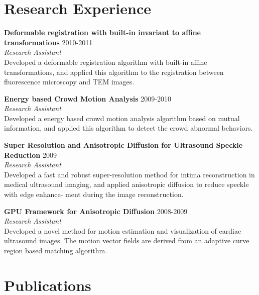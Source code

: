 \documentclass[line,margin]{res}
\begin{document}
\begin{resume}
\section{\sc Research Experience} 
\smallskip

\textbf{Deformable registration with built-in invariant to aﬃne transformations} \hfill      2010-2011 \\
\textit{ Research Assistant}\\
Developed a deformable registration algorithm with built-in aﬃne transformations, and
applied this algorithm to the registration between ﬂuorescence microscopy and TEM images.

\textbf{Energy based Crowd Motion Analysis} \hfill      2009-2010 \\
\textit{Research Assistant}\\
Developed a energy based crowd motion analysis algorithm based on mutual information, and
applied this algorithm to detect the crowd abnormal behaviors.

\textbf{Super Resolution and Anisotropic Diﬀusion for Ultrasound Speckle Reduction} \hfill      2009 \\
\textit{Research Assistant}\\
Developed a fast and robust super-resolution method for intima reconstruction in medical
ultrasound imaging, and applied anisotropic diﬀusion to reduce speckle with edge enhance-
ment during the image reconstruction.

\textbf{GPU Framework for Anisotropic Diffusion} \hfill      2008-2009 \\
\textit{Research Assistant}\\
Developed a novel method for motion estimation and visualization of cardiac ultrasound
images. The motion vector ﬁelds are derived from an adaptive curve region based matching
algorithm.

\section{\sc Publications}  


\end{resume}
\end{document}
